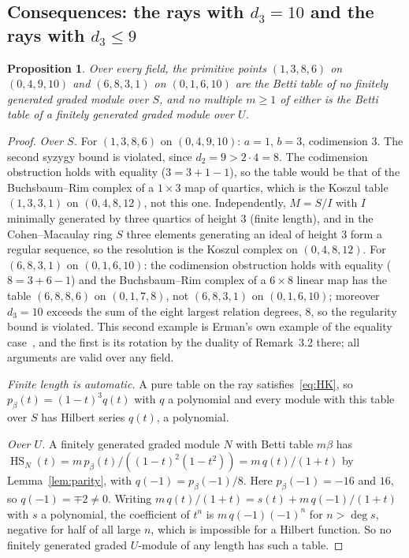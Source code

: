\documentclass[11pt]{article}
\newtheorem{proposition}{Proposition}
\theoremstyle{definition}
\theoremstyle{remark}
\newcommand{\Hilb}{\operatorname{HS}}
\begin{document}
\subsection{Consequences: the rays with \texorpdfstring{$d_3=10$}{d3=10} and the rays with \texorpdfstring{$d_3\le9$}{d3<=9}}
\label{sec:consequences}

\begin{proposition}\label{prop:least}
Over every field, the primitive points $(1,3,8,6)$ on $(0,4,9,10)$ and $(6,8,3,1)$ on $(0,1,6,10)$ are the Betti table of no finitely generated graded module over $S$, and no multiple $m\ge1$ of either is the Betti table of a finitely generated graded module over $U$.
\end{proposition}
\begin{proof}
\emph{Over $S$.} For $(1,3,8,6)$ on $(0,4,9,10)$: $a=1$, $b=3$, codimension $3$. The second syzygy bound is violated, since $d_2=9>2\cdot4=8$. The codimension obstruction holds with equality ($3=3+1-1$), so the table would be that of the Buchsbaum--Rim complex of a $1\times3$ map of quartics, which is the Koszul table $(1,3,3,1)$ on $(0,4,8,12)$, not this one. Independently, $M=S/I$ with $I$ minimally generated by three quartics of height $3$ (finite length), and in the Cohen--Macaulay ring $S$ three elements generating an ideal of height $3$ form a regular sequence, so the resolution is the Koszul complex on $(0,4,8,12)$. For $(6,8,3,1)$ on $(0,1,6,10)$: the codimension obstruction holds with equality ($8=3+6-1$) and the Buchsbaum--Rim complex of a $6\times8$ linear map has the table $(6,8,8,6)$ on $(0,1,7,8)$, not $(6,8,3,1)$ on $(0,1,6,10)$; moreover $d_3=10$ exceeds the sum of the eight largest relation degrees, $8$, so the regularity bound is violated. This second example is Erman's own example of the equality case~\cite[Proposition~3.1 and the discussion that follows]{Erman09}, and the first is its rotation by the duality of Remark~3.2 there; all arguments are valid over any field.

\emph{Finite length is automatic.} A pure table on the ray satisfies~\eqref{eq:HK}, so $p_\beta(t)=(1-t)^3q(t)$ with $q$ a polynomial and every module with this table over $S$ has Hilbert series $q(t)$, a polynomial.

\emph{Over $U$.} A finitely generated graded module $N$ with Betti table $m\beta$ has $\Hilb_N(t)=m\,p_\beta(t)/((1-t)^2(1-t^2))=m\,q(t)/(1+t)$ by Lemma~\ref{lem:parity}, with $q(-1)=p_\beta(-1)/8$. Here $p_\beta(-1)=-16$ and $16$, so $q(-1)=\mp2\neq0$. Writing $m\,q(t)/(1+t)=s(t)+m\,q(-1)/(1+t)$ with $s$ a polynomial, the coefficient of $t^n$ is $m\,q(-1)(-1)^n$ for $n>\deg s$, negative for half of all large $n$, which is impossible for a Hilbert function. So no finitely generated graded $U$-module of any length has such a table.
\end{proof}
\end{document}
